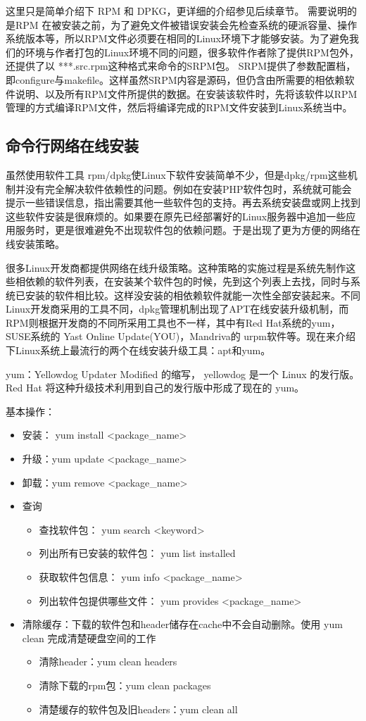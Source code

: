 这里只是简单介绍下 RPM 和 DPKG，更详细的介绍参见后续章节。 需要说明的是RPM 在被安装之前，为了避免文件被错误安装会先检查系统的硬派容量、操作系统版本等，所以RPM文件必须要在相同的Linux环境下才能够安装。为了避免我们的环境与作者打包的Linux环境不同的问题，很多软件作者除了提供RPM包外，还提供了以 ***.src.rpm这种格式来命令的SRPM包。 SRPM提供了参数配置档，即configure与makefile。这样虽然SRPM内容是源码，但仍含由所需要的相依赖软件说明、以及所有RPM文件所提供的数据。在安装该软件时，先将该软件以RPM管理的方式编译RPM文件，然后将编译完成的RPM文件安装到Linux系统当中。



\subsection{命令行网络在线安装}
虽然使用软件工具 rpm/dpkg使Linux下软件安装简单不少，但是dpkg/rpm这些机制并没有完全解决软件依赖性的问题。例如在安装PHP软件包时，系统就可能会提示一些错误信息，指出需要其他一些软件包的支持。再去系统安装盘或网上找到这些软件安装是很麻烦的。如果要在原先已经部署好的Linux服务器中追加一些应用服务时，更是很难避免不出现软件包的依赖问题。于是出现了更为方便的网络在线安装策略。

很多Linux开发商都提供网络在线升级策略。这种策略的实施过程是系统先制作这些相依赖的软件列表，在安装某个软件包的时候，先到这个列表上去找，同时与系统已安装的软件相比较。这样没安装的相依赖软件就能一次性全部安装起来。不同Linux开发商采用的工具不同，dpkg管理机制出现了APT在线安装升级机制，而RPM则根据开发商的不同所采用工具也不一样，其中有Red Hat系统的yum，SUSE系统的 Yast Online Update(YOU)，Mandriva的 urpm软件等。现在来介绍下Linux系统上最流行的两个在线安装升级工具：apt和yum。

yum：Yellowdog Updater Modified 的缩写， yellowdog 是一个 Linux 的发行版。 Red Hat 将这种升级技术利用到自己的发行版中形成了现在的 yum。

基本操作：
\begin{itemize}
\item
安装： yum install <package\_name>
\item
升级：yum update <package\_name>
\item
卸载：yum remove <package\_name>
\item
查询
	\begin{itemize}
	\item	查找软件包： yum search <keyword>
	\item	列出所有已安装的软件包： yum list installed
	\item 	获取软件包信息： yum info <package\_name>
	\item 	列出软件包提供哪些文件： yum provides <package\_name>
	\end{itemize} 
\item 清除缓存：下载的软件包和header储存在cache中不会自动删除。使用 yum clean 完成清楚硬盘空间的工作
	\begin{itemize}
	\item 	清除header：yum clean headers
	\item 	清除下载的rpm包：yum clean packages
	\item 	清楚缓存的软件包及旧headers：yum clean all
	\end{itemize} 
\end{itemize} 


